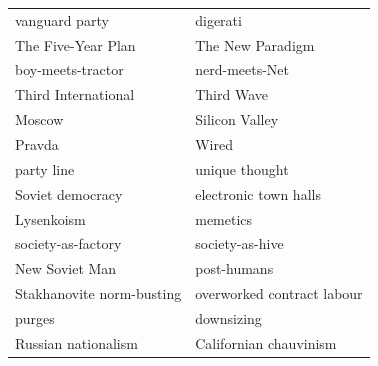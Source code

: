 \documentclass[letterpaper,12pt,english]{sphinxmanual}
\begin{document}
\begin{tabulary}{\linewidth}{|L|L|}
\hline

vanguard party
 & 
digerati
\\

The Five-Year Plan
 & 
The New Paradigm
\\

boy-meets-tractor
 & 
nerd-meets-Net
\\

Third International
 & 
Third Wave
\\

Moscow
 & 
Silicon Valley
\\

Pravda
 & 
Wired
\\

party line
 & 
unique thought
\\

Soviet democracy
 & 
electronic town halls
\\

Lysenkoism
 & 
memetics
\\

society-as-factory
 & 
society-as-hive
\\

New Soviet Man
 & 
post-humans
\\

Stakhanovite norm-busting
 & 
overworked contract labour
\\

purges
 & 
downsizing
\\

Russian nationalism
 & 
Californian chauvinism
\\
\hline\end{tabulary}
\end{document}
